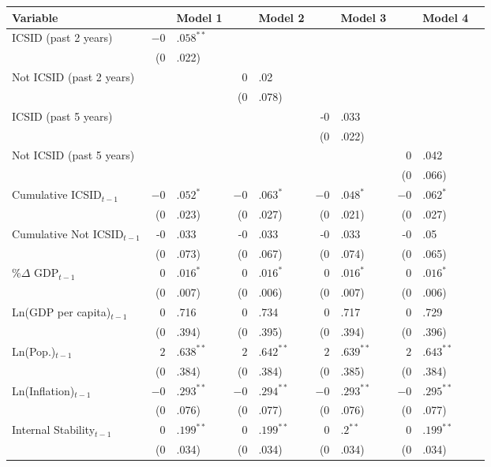 \begin{enumerate}
\begin{itemize}
			\begin{table}[ht]
			\centering
			\begingroup\footnotesize
			\begin{tabular}{lr@{}lr@{}lr@{}lr@{}lr@{}}
			 Variable && Model 1 && Model 2 && Model 3 && Model 4 \\ 
			  \hline
			\hline
			ICSID (past 2 years) & $-0$&$.058^{\ast\ast}$ &&  &&  &&  \\ 
			   & (0&.022) &&  &&  &&  \\ 
			  Not ICSID (past 2 years) &  && 0&.02 &&  &&  \\ 
			   &  && (0&.078) &&  &&  \\    
			  ICSID (past 5 years) &  &&  && -0&.033 &&  \\ 
			   &  &&  && (0&.022) &&  \\ 
			  Not ICSID (past 5 years) &  &&  &&  && 0&.042 \\ 
			   &  &&  &&  && (0&.066) \\ 
			  Cumulative ICSID$_{t-1}$ & $-0$&$.052^{\ast}$ & $-0$&$.063^{\ast}$ & $-0$&$.048^{\ast}$ & $-0$&$.062^{\ast}$ \\ 
			   & (0&.023) & (0&.027) & (0&.021) & (0&.027) \\ 
			  Cumulative Not ICSID$_{t-1}$ & -0&.033 & -0&.033 & -0&.033 & -0&.05 \\ 
			   & (0&.073) & (0&.067) & (0&.074) & (0&.065) \\ 
			  \%$\Delta$ GDP$_{t-1}$ & $0$&$.016^{\ast}$ & $0$&$.016^{\ast}$ & $0$&$.016^{\ast}$ & $0$&$.016^{\ast}$ \\ 
			   & (0&.007) & (0&.006) & (0&.007) & (0&.006) \\ 
			  Ln(GDP per capita)$_{t-1}$ & 0&.716 & 0&.734 & 0&.717 & 0&.729 \\ 
			   & (0&.394) & (0&.395) & (0&.394) & (0&.396) \\ 
			  Ln(Pop.)$_{t-1}$ & $2$&$.638^{\ast\ast}$ & $2$&$.642^{\ast\ast}$ & $2$&$.639^{\ast\ast}$ & $2$&$.643^{\ast\ast}$ \\ 
			   & (0&.384) & (0&.384) & (0&.385) & (0&.384) \\ 
			  Ln(Inflation)$_{t-1}$ & $-0$&$.293^{\ast\ast}$ & $-0$&$.294^{\ast\ast}$ & $-0$&$.293^{\ast\ast}$ & $-0$&$.295^{\ast\ast}$ \\ 
			   & (0&.076) & (0&.077) & (0&.076) & (0&.077) \\ 
			  Internal Stability$_{t-1}$ & $0$&$.199^{\ast\ast}$ & $0$&$.199^{\ast\ast}$ & $0$&$.2^{\ast\ast}$ & $0$&$.199^{\ast\ast}$ \\ 
			   & (0&.034) & (0&.034) & (0&.034) & (0&.034) \\ 

\end{tabular}
\end{table}
\end{itemize}
\end{enumerate}
